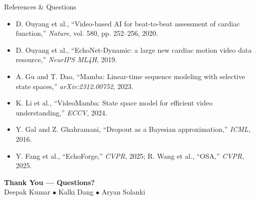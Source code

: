 \documentclass[aspectratio=169,11pt]{beamer}
\begin{document}
\begin{frame}{References \& Questions}
\scriptsize
\begin{itemize}
    \item[{[1]}] D. Ouyang et al., ``Video-based AI for beat-to-beat assessment of cardiac function,'' \textit{Nature}, vol. 580, pp. 252--256, 2020.
    \item[{[2]}] D. Ouyang et al., ``EchoNet-Dynamic: a large new cardiac motion video data resource,'' \textit{NeurIPS ML4H}, 2019.
    \item[{[3]}] A. Gu and T. Dao, ``Mamba: Linear-time sequence modeling with selective state spaces,'' \textit{arXiv:2312.00752}, 2023.
    \item[{[4]}] K. Li et al., ``VideoMamba: State space model for efficient video understanding,'' \textit{ECCV}, 2024.
    \item[{[5]}] Y. Gal and Z. Ghahramani, ``Dropout as a Bayesian approximation,'' \textit{ICML}, 2016.
    \item[{[6]}] Y. Fang et al., ``EchoForge,'' \textit{CVPR}, 2025; R. Wang et al., ``OSA,'' \textit{CVPR}, 2025.
\end{itemize}
\vspace{0.8em}
\centering\normalsize\textbf{Thank You --- Questions?}\\
\small Deepak Kumar $\bullet$ Kalki Dang $\bullet$ Aryan Solanki
\end{frame}
\end{document}
